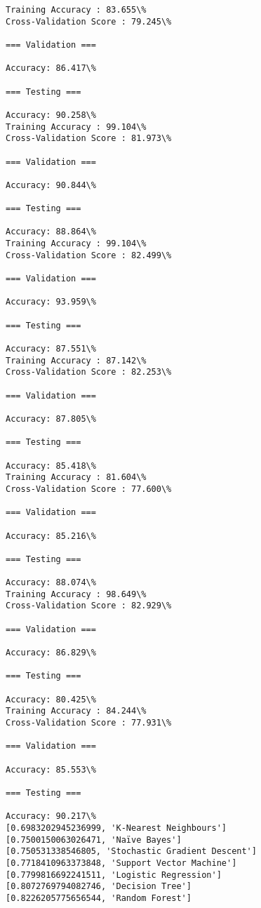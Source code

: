 \documentclass[11pt]{article}
\begin{document}
    \begin{Verbatim}[commandchars=\\\{\}]
Training Accuracy : 83.655\%
Cross-Validation Score : 79.245\%

=== Validation ===

Accuracy: 86.417\%

=== Testing ===

Accuracy: 90.258\%
Training Accuracy : 99.104\%
Cross-Validation Score : 81.973\%

=== Validation ===

Accuracy: 90.844\%

=== Testing ===

Accuracy: 88.864\%
Training Accuracy : 99.104\%
Cross-Validation Score : 82.499\%

=== Validation ===

Accuracy: 93.959\%

=== Testing ===

Accuracy: 87.551\%
Training Accuracy : 87.142\%
Cross-Validation Score : 82.253\%

=== Validation ===

Accuracy: 87.805\%

=== Testing ===

Accuracy: 85.418\%
Training Accuracy : 81.604\%
Cross-Validation Score : 77.600\%

=== Validation ===

Accuracy: 85.216\%

=== Testing ===

Accuracy: 88.074\%
Training Accuracy : 98.649\%
Cross-Validation Score : 82.929\%

=== Validation ===

Accuracy: 86.829\%

=== Testing ===

Accuracy: 80.425\%
Training Accuracy : 84.244\%
Cross-Validation Score : 77.931\%

=== Validation ===

Accuracy: 85.553\%

=== Testing ===

Accuracy: 90.217\%
[0.6983202945236999, 'K-Nearest Neighbours']
[0.7500150063026471, 'Naïve Bayes']
[0.750531338546805, 'Stochastic Gradient Descent']
[0.7718410963373848, 'Support Vector Machine']
[0.7799816692241511, 'Logistic Regression']
[0.8072769794082746, 'Decision Tree']
[0.8226205775656544, 'Random Forest']

    \end{Verbatim}
\end{document}
